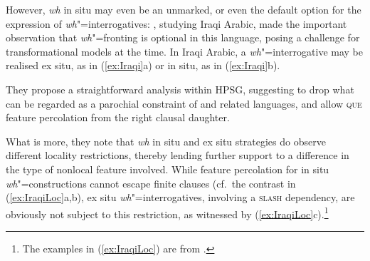 \documentclass[output=paper
,notxmath 
 	        ,biblatex
                ,babelshorthands
                ,newtxmath
                ,draftmode
                ,colorlinks, citecolor=brown
]{langscibook}
\begin{document}
However, \emph{wh} in situ may even be an unmarked, or even the default
option for the expression of \emph{wh}"=interrogatives:
\citet[Section~6.2]{Johnson:Lappin:97}, studying Iraqi Arabic, made the important
observation that \emph{wh}"=fronting is optional in this language,
posing a challenge for transformational models at the time.  In Iraqi
Arabic, a \emph{wh}"=interrogative may be realised ex situ, as in
(\ref{ex:Iraqi}a) or in situ, as in (\ref{ex:Iraqi}b).

\eal
\label{ex:Iraqi}
\zl

\noindent
They propose a straightforward analysis within HPSG, suggesting to
drop what can be regarded as a parochial constraint of  and
related languages, and allow \textsc{que} feature percolation from the
right clausal daughter.
 
What is more, they note that \emph{wh} in situ and ex situ strategies
do observe different locality restrictions, thereby lending further
support to a difference in the type of nonlocal feature
involved. While feature percolation for in situ
\emph{wh}"=constructions cannot escape finite clauses (cf.\ the
contrast in (\ref{ex:IraqiLoc}a,b), ex situ \emph{wh}"=interrogatives,
involving a \textsc{slash} dependency, are obviously not subject to
this restriction, as witnessed by (\ref{ex:IraqiLoc}c).\footnote{The examples in (\ref{ex:IraqiLoc}) are from .}


    
\eal \label{ex:IraqiLoc}
\zl
\end{document}
